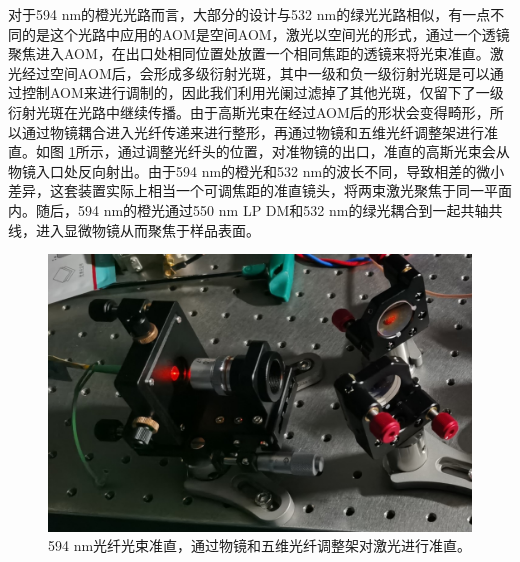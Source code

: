 \documentclass[type = bachelor]{whu-thesis}
\begin{document}
对于594 nm的橙光光路而言，大部分的设计与532 nm的绿光光路相似，有一点不同的是这个光路中应用的AOM是空间AOM，激光以空间光的形式，通过一个透镜聚焦进入AOM，在出口处相同位置处放置一个相同焦距的透镜来将光束准直。激光经过空间AOM后，会形成多级衍射光斑，其中一级和负一级衍射光斑是可以通过控制AOM来进行调制的，因此我们利用光阑过滤掉了其他光斑，仅留下了一级衍射光斑在光路中继续传播。由于高斯光束在经过AOM后的形状会变得畸形，所以通过物镜耦合进入光纤传递来进行整形，再通过物镜和五维光纤调整架进行准直。如图 \ref{fig: 594 Collimator}所示，通过调整光纤头的位置，对准物镜的出口，准直的高斯光束会从物镜入口处反向射出。由于594 nm的橙光和532 nm的波长不同，导致相差的微小差异，这套装置实际上相当一个可调焦距的准直镜头，将两束激光聚焦于同一平面内。随后，594 nm的橙光通过550 nm LP DM和532 nm的绿光耦合到一起共轴共线，进入显微物镜从而聚焦于样品表面。
\begin{figure}
  \centering
  \includegraphics[width=1.0\textwidth]{figures/Chapter 1/594 Collimator.jpg}
  \caption[594 nm光纤光束准直]{594 nm光纤光束准直，通过物镜和五维光纤调整架对激光进行准直。}
  \label{fig: 594 Collimator}
\end{figure}
\end{document}
